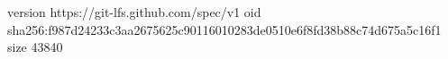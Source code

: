 version https://git-lfs.github.com/spec/v1
oid sha256:f987d24233c3aa2675625c90116010283de0510e6f8fd38b88c74d675a5c16f1
size 43840
